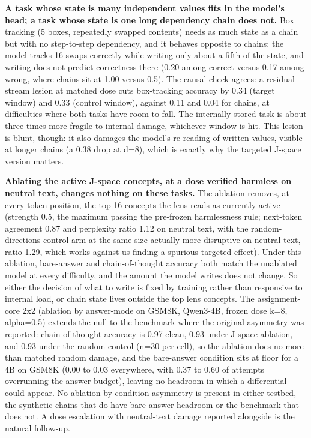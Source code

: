 \textbf{A task whose state is many independent values fits in the
model's head; a task whose state is one long dependency chain does not.}
Box tracking (5 boxes, repeatedly swapped contents) needs as much state
as a chain but with no step-to-step dependency, and it behaves opposite
to chains: the model tracks 16 swaps correctly while writing only about
a fifth of the state, and writing does not predict correctness there
(0.20 among correct versus 0.17 among wrong, where chains sit at 1.00
versus 0.5). The causal check agrees: a residual-stream lesion at
matched dose cuts box-tracking accuracy by 0.34 (target window) and 0.33
(control window), against 0.11 and 0.04 for chains, at difficulties
where both tasks have room to fall. The internally-stored task is about
three times more fragile to internal damage, whichever window is hit.
This lesion is blunt, though: it also damages the model's re-reading of
written values, visible at longer chains (a 0.38 drop at d=8), which is
exactly why the targeted J-space version matters.

\textbf{Ablating the active J-space concepts, at a dose verified
harmless on neutral text, changes nothing on these tasks.} The ablation
removes, at every token position, the top-16 concepts the lens reads as
currently active (strength 0.5, the maximum passing the pre-frozen
harmlessness rule; next-token agreement 0.87 and perplexity ratio 1.12
on neutral text, with the random-directions control arm at the same size
actually more disruptive on neutral text, ratio 1.29, which works
against us finding a spurious targeted effect). Under this ablation,
bare-answer and chain-of-thought accuracy both match the unablated model
at every difficulty, and the amount the model writes does not change. So
either the decision of what to write is fixed by training rather than
responsive to internal load, or chain state lives outside the top lens
concepts. The assignment-core 2x2 (ablation by answer-mode on GSM8K,
Qwen3-4B, frozen dose k=8, alpha=0.5) extends the null to the benchmark
where the original asymmetry was reported: chain-of-thought accuracy is
0.97 clean, 0.93 under J-space ablation, and 0.93 under the random
control (n=30 per cell), so the ablation does no more than matched
random damage, and the bare-answer condition sits at floor for a 4B on
GSM8K (0.00 to 0.03 everywhere, with 0.37 to 0.60 of attempts
overrunning the answer budget), leaving no headroom in which a
differential could appear. No ablation-by-condition asymmetry is present
in either testbed, the synthetic chains that do have bare-answer
headroom or the benchmark that does not. A dose escalation with
neutral-text damage reported alongside is the natural follow-up.

